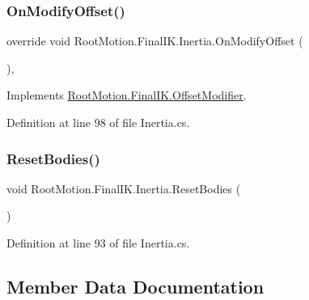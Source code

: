\subsubsection{\texorpdfstring{On\+Modify\+Offset()}{OnModifyOffset()}}
{\footnotesize\ttfamily override void Root\+Motion.\+Final\+I\+K.\+Inertia.\+On\+Modify\+Offset (\begin{DoxyParamCaption}{ }\end{DoxyParamCaption})\hspace{0.3cm}{\ttfamily [protected]}, {\ttfamily [virtual]}}



Implements \mbox{\hyperlink{class_root_motion_1_1_final_i_k_1_1_offset_modifier_a777e9ffb4afca3d8647959a79a1120bb}{Root\+Motion.\+Final\+I\+K.\+Offset\+Modifier}}.



Definition at line 98 of file Inertia.\+cs.

\mbox{\label{class_root_motion_1_1_final_i_k_1_1_inertia_ac619d5414996c0cf828620d41415cc93}} 
\subsubsection{\texorpdfstring{Reset\+Bodies()}{ResetBodies()}}
{\footnotesize\ttfamily void Root\+Motion.\+Final\+I\+K.\+Inertia.\+Reset\+Bodies (\begin{DoxyParamCaption}{ }\end{DoxyParamCaption})}



Definition at line 93 of file Inertia.\+cs.



\subsection{Member Data Documentation}
\mbox{\label{class_root_motion_1_1_final_i_k_1_1_inertia_a986b39668a3e043ea8804b8eeebf9ccc}} 

